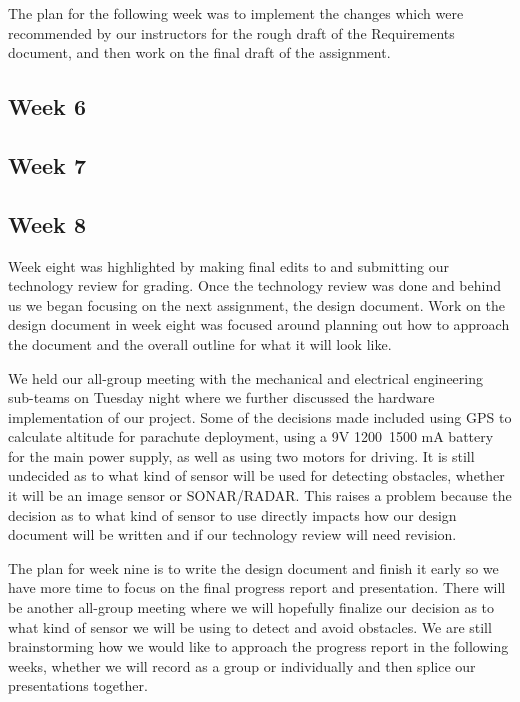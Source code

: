 \documentclass[10pt,letterpaper,onecolumn,draftclsnofoot,journal]{IEEEtran}
\begin{document}
\par 
The plan for the following week was to implement the changes which were recommended by our instructors for the rough draft of the Requirements document, and then work on the final draft of the assignment.

\subsection{Week 6}


\subsection{Week 7}


\subsection{Week 8}
\par
Week eight was highlighted by making final edits to and submitting our technology review for grading. Once the technology review was done and behind us we began focusing on the next assignment, the design document. Work on the design document in week eight was focused around planning out how to approach the document and the overall outline for what it will look like.
\par
We held our all-group meeting with the mechanical and electrical engineering sub-teams on Tuesday night where we further discussed the hardware implementation of our project. Some of the decisions made included using GPS to calculate altitude for parachute deployment, using a 9V 1200~1500 mA battery for the main power supply, as well as using two motors for driving. It is still undecided as to what kind of sensor will be used for detecting obstacles, whether it will be an image sensor or SONAR/RADAR. This raises a problem because the decision as to what kind of sensor to use directly impacts how our design document will be written and if our technology review will need revision.
\par
The plan for week nine is to write the design document and finish it early so we have more time to focus on the final progress report and presentation. There will be another all-group meeting where we will hopefully finalize our decision as to what kind of sensor we will be using to detect and avoid obstacles. We are still brainstorming how we would like to approach the progress report in the following weeks, whether we will record as a group or individually and then splice our presentations together.
\end{document}
